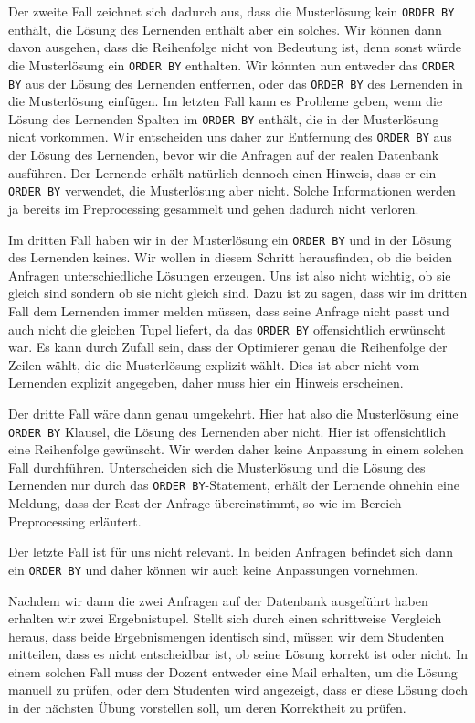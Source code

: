 Der zweite Fall zeichnet sich dadurch aus, dass die Musterlösung kein \verb|ORDER BY| enthält, die Lösung des Lernenden enthält aber ein solches. Wir können dann davon ausgehen, dass die Reihenfolge nicht von Bedeutung ist, denn sonst würde die Musterlösung ein \verb|ORDER BY| enthalten. Wir könnten nun entweder das \verb|ORDER BY| aus der Lösung des Lernenden entfernen, oder das \verb|ORDER BY| des Lernenden in die Musterlösung einfügen. Im letzten Fall kann es Probleme geben, wenn die Lösung des Lernenden Spalten im \verb|ORDER BY| enthält, die in der Musterlösung nicht vorkommen. Wir entscheiden uns daher zur Entfernung des \verb|ORDER BY| aus der Lösung des Lernenden, bevor wir die Anfragen auf der realen Datenbank ausführen. Der Lernende erhält natürlich dennoch einen Hinweis, dass er ein \verb|ORDER BY| verwendet, die Musterlösung aber nicht. Solche Informationen werden ja bereits im Preprocessing gesammelt und gehen dadurch nicht verloren.

Im dritten Fall haben wir in der Musterlösung ein \verb|ORDER BY| und in der Lösung des Lernenden keines. Wir wollen in diesem Schritt herausfinden, ob die beiden Anfragen unterschiedliche Lösungen erzeugen. Uns ist also nicht wichtig, ob sie gleich sind sondern ob sie nicht gleich sind. Dazu ist zu sagen, dass wir im dritten Fall dem Lernenden immer melden müssen, dass seine Anfrage nicht passt und auch nicht die gleichen Tupel liefert, da das \verb|ORDER BY| offensichtlich erwünscht war. Es kann durch Zufall sein, dass der Optimierer genau die Reihenfolge der Zeilen wählt, die die Musterlösung explizit wählt. Dies ist aber nicht vom Lernenden explizit angegeben, daher muss hier ein Hinweis erscheinen.

Der dritte Fall wäre dann genau umgekehrt. Hier hat also die Musterlösung eine \verb|ORDER BY| Klausel, die Lösung des Lernenden aber nicht. Hier ist offensichtlich eine Reihenfolge gewünscht. Wir werden daher keine Anpassung in einem solchen Fall durchführen. Unterscheiden sich die Musterlösung und die Lösung des Lernenden nur durch das \verb|ORDER BY|-Statement, erhält der Lernende ohnehin eine Meldung, dass der Rest der Anfrage übereinstimmt, so wie im Bereich Preprocessing erläutert.

Der letzte Fall ist für uns nicht relevant. In beiden Anfragen befindet sich dann ein \verb|ORDER BY| und daher können wir auch keine Anpassungen vornehmen. 

Nachdem wir dann die zwei Anfragen auf der Datenbank ausgeführt haben erhalten wir zwei Ergebnistupel. Stellt sich durch einen schrittweise Vergleich heraus, dass beide Ergebnismengen identisch sind, müssen wir dem Studenten mitteilen, dass es nicht entscheidbar ist, ob seine Lösung korrekt ist oder nicht. In einem solchen Fall muss der Dozent entweder eine Mail erhalten, um die Lösung manuell zu prüfen, oder dem Studenten wird angezeigt, dass er diese Lösung doch in der nächsten Übung vorstellen soll, um deren Korrektheit zu prüfen.

